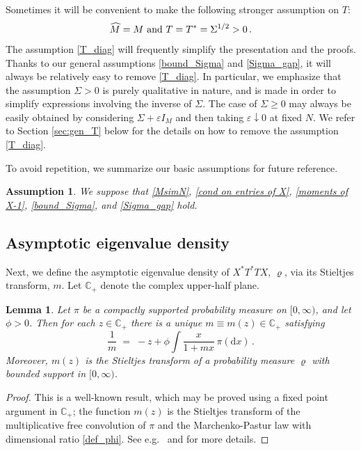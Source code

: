 \documentclass[11pt]{article} %
\numberwithin{equation}{section}
\numberwithin{figure}{section}
\theoremstyle{plain} %
\newtheorem{lemma}[theorem]{Lemma}
\newtheorem{assumption}[theorem]{Assumption}
\theoremstyle{definition} %
\newcommand{\bb}{\mathbb} %
\newcommand{\wh}{\widehat}
\newcommand{\txt}[1]{\text{\rm{#1}}}
\newcommand{\C}{\mathbb{C}}
\newcommand{\dd}{\mathrm{d}}
\renewcommand{\geq}{\geqslant}
\renewcommand{\epsilon}{\varepsilon}
\begin{document}
Sometimes it will be convenient to make the following stronger assumption on $T$:
\begin{equation} \label{T_diag}
\wh M = M \txt{ and } T = T^* = \Sigma^{1/2} > 0\,.
\end{equation}
The assumption \eqref{T_diag} will frequently simplify the presentation and the proofs. Thanks to our general assumptions \eqref{bound_Sigma} and \eqref{Sigma_gap}, it will always be relatively easy to remove \eqref{T_diag}. In particular, we emphasize that the assumption $\Sigma > 0$ is purely qualitative in nature, and is made in order to simplify expressions involving the inverse of $\Sigma$. The case of $\Sigma \geq 0$ may always be easily obtained by considering $\Sigma + \epsilon I_M$ and then taking $\epsilon \downarrow 0$ at fixed $N$. We refer to Section \ref{sec:gen_T} below for the details on how to remove the assumption \eqref{T_diag}.


To avoid repetition, we summarize our basic assumptions for future reference.
\begin{assumption} \label{ass:main}
We suppose that \eqref{MsimN}, \eqref{cond on entries of X}, \eqref{moments of X-1}, \eqref{bound_Sigma}, and \eqref{Sigma_gap} hold.
\end{assumption}








\subsection{Asymptotic eigenvalue density} \label{sec:structure of rho}

Next, we define the asymptotic eigenvalue density of $X^* T^* T X $, $\varrho$, via its Stieltjes transform, $m$. Let $\bb C_+$ denote the complex upper-half plane. 
\begin{lemma}
Let $\pi$ be a compactly supported probability measure on $[0,\infty)$, and let $\phi > 0$. Then for each $z \in \bb C_+$ there is a unique $m \equiv m(z) \in \bb C_+$ satisfying
\begin{equation} \label{m_sc_eq}
\frac{1}{m} \;=\; -z + \phi \int \frac{x}{1 + m x} \, \pi(\dd x)\,.
\end{equation}
Moreover, $m(z)$ is the Stieltjes transform of a probability measure $\varrho$ with bounded support in $[0,\infty)$.
\end{lemma}
\begin{proof}
This is a well-known result, which may be proved using a fixed point argument in $\C_+$; the function $m(z)$ is the Stieltjes transform of the multiplicative free convolution of $\pi$ and the Marchenko-Pastur law with dimensional ratio \eqref{def_phi}. See e.g.\ \cite[Section 5]{BS4} and \cite{BSbook} for more details.
\end{proof}
\end{document}
